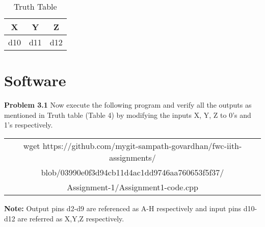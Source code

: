 \documentclass[journal,12pt,twocolumn]{IEEEtran}
\begin{document}
    \begin{table}[h]
    \centering
    \begin{tabular}{| c | c | c |}
    \hline
    \textbf{X} & \textbf{Y} & \textbf{Z} \\
    \hline
    d10 & d11 & d12  \\
    \hline
    \end{tabular}
    \caption{Truth Table}
    \label{tab:my_label}
 \end{table}


\section{Software}

\textbf{Problem 3.1} Now execute the following program and verify all the outputs as mentioned in Truth table (Table 4) by modifying the inputs X, Y, Z to 0's and 1's respectively. \\
\begin{table}[h]
    \centering
    \begin{tabular}{| c |}
    \hline
    wget https://github.com/mygit-sampath-govardhan/fwc-iith-assignments/\\blob/03990e0f3d94cb11d4ac1dd9746aa760653f5f37/\\Assignment-1/Assignment1-code.cpp\\
    \hline
    \end{tabular}
\end{table}

\textbf{Note:} Output pins d2-d9 are referenced as A-H respectively and input pins d10-d12 are referred as X,Y,Z respectively.\\
\end{document}
